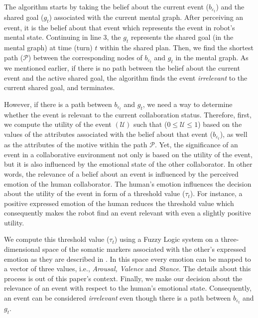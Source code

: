 \documentclass[letterpaper]{article}
\begin{document}
The algorithm starts by taking the belief about the current event
($\mathit{b}_{\varepsilon_t}$) and the shared goal ($g_{t}$) associated with the
current mental graph. After perceiving an event, it is the belief about that
event which represents the event in robot's mental state. Continuing in line 3,
the $g_{t}$ represents the shared goal (in the mental graph) at time (turn) $t$
within the shared plan. Then, we find the shortest path ($\mathcal{P}$) between
the corresponding nodes of $\mathit{b}_{\varepsilon_t}$ and $g_{t}$ in the
mental graph. As we mentioned earlier, if there is no path between the belief
about the current event and the active shared goal, the algorithm finds the
event \textit{irrelevant} to the current shared goal, and terminates.

However, if there is a path between $\mathit{b}_{\varepsilon_t}$ and $g_{t}$, we
need a way to determine whether the event is relevant to the current
collaboration status. Therefore, first, we compute the utility of the event
$(\mathcal{U})$ such that ($0 \leq \mathcal{U} \leq 1$) based on the values of
the attributes associated with the belief about that event
($\mathit{b}_{\varepsilon_t}$), as well as the attributes of the motive within
the path $\mathcal{P}$. Yet, the significance of an event in a collaborative
environment not only is based on the utility of the event, but it is also
influenced by the emotional state of the other collaborator. In other words, the
relevance of a belief about an event is influenced by the perceived emotion of
the human collaborator. The human's emotion influences the decision about the
utility of the event in form of a threshold value ($\tau_{t}$). For instance, a
positive expressed emotion of the human reduces the threshold value which
consequently makes the robot find an event relevant with even a slightly
positive utility.

We compute this threshold value ($\tau_{t}$) using a Fuzzy Logic system on a
three-dimensional space of the somatic markers associated with the other's
expressed emotion as they are described in \cite{breazeal:sociable-robot}. In
this space every emotion can be mapped to a vector of three values, i.e.,
\textit{Arousal, Valence} and \textit{Stance}. The details about this process is
out of this paper's context. Finally, we make our decision about the relevance
of an event with respect to the human's emotional state. Consequently, an event
can be considered \textit{irrelevant} even though there is a path between
$\mathit{b}_{\varepsilon_t}$ and $g_{t}$.
\end{document}
